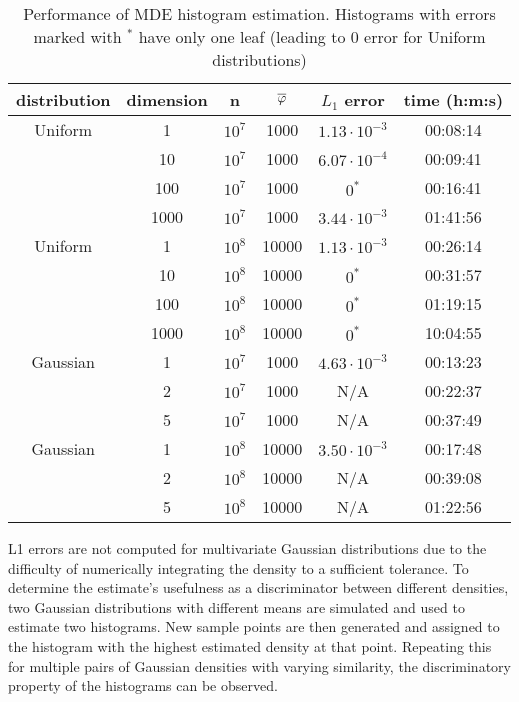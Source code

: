 \documentclass[../scalable-hists.tex]{subfiles}
\begin{document}
  \begin{table}
    \centering
    \begin{tabular}{|ccc|c|c|c|}
      \hline
      distribution & dimension & n & $\overline {\varphi}$ & $L_1$ error & time (h:m:s) \\
      \hline
      Uniform & 1     & $10^7$ & 1000  & $1.13 \cdot 10^{-3}$ & 00:08:14 \\
      & 10    & $10^7$ & 1000  & $6.07 \cdot 10^{-4}$ & 00:09:41 \\
      & 100   & $10^7$ & 1000  & $0^*$ & 00:16:41 \\
      & 1000  & $10^7$ & 1000  & $3.44 \cdot 10^{-3}$ & 01:41:56 \\
      \hline
      Uniform & 1     & $10^8$ & 10000 & $1.13 \cdot 10^{-3}$ & 00:26:14 \\
      & 10    & $10^8$ & 10000 & $0^*$ & 00:31:57 \\
      & 100   & $10^8$ & 10000 & $0^*$ & 01:19:15 \\
      & 1000  & $10^8$ & 10000 & $0^*$ & 10:04:55 \\
      \hline 
      \hline 
      Gaussian & 1    & $10^7$ & 1000  & $4.63 \cdot 10^{-3}$ & 00:13:23 \\
      & 2    & $10^7$ & 1000  & N/A & 00:22:37 \\
      & 5    & $10^7$ & 1000  & N/A & 00:37:49 \\
      \hline 
      Gaussian & 1    & $10^8$ & 10000 & $3.50 \cdot 10^{-3}$ & 00:17:48 \\
      & 2    & $10^8$ & 10000 & N/A & 00:39:08 \\
      & 5    & $10^8$ & 10000 & N/A & 01:22:56 \\
      \hline 
    \end{tabular}
    \caption{Performance of MDE histogram estimation.
    Histograms with errors marked with $^*$ have only one leaf (leading to 0 error for Uniform distributions)}
    \label{tab:mde-results}
  \end{table}

  L1 errors are not computed for multivariate Gaussian distributions
  due to the difficulty of numerically integrating the density
  to a sufficient tolerance.
  To determine the estimate's usefulness as a discriminator between different densities,
  two Gaussian distributions with different means are 
  simulated and used to estimate two histograms.
  New sample points are then generated and assigned to
  the histogram with the highest estimated density at that point.
  Repeating this for multiple pairs of Gaussian densities with varying similarity,
  the discriminatory property of the histograms can be observed.
\end{document}
